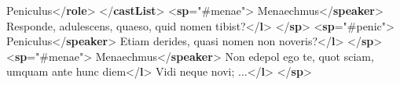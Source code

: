 \begin{shaded}
\hspace*{1em}Peniculus{</\textbf{role}>}\mbox{}\newline 
{}\mbox{}\newline 
{</\textbf{castList}>}\mbox{}\newline 
{<\textbf{sp}\hspace*{1em}{who}="{\#menae}">}\mbox{}\newline 
{}Menaechmus{</\textbf{speaker}>}\mbox{}\newline 
{}Responde, adulescens, quaeso, quid nomen tibist?{</\textbf{l}>}\mbox{}\newline 
{</\textbf{sp}>}\mbox{}\newline 
{<\textbf{sp}\hspace*{1em}{who}="{\#penic}">}\mbox{}\newline 
{}Peniculus{</\textbf{speaker}>}\mbox{}\newline 
{}Etiam derides, quasi nomen non noveris?{</\textbf{l}>}\mbox{}\newline 
{</\textbf{sp}>}\mbox{}\newline 
{<\textbf{sp}\hspace*{1em}{who}="{\#menae}">}\mbox{}\newline 
{}Menaechmus{</\textbf{speaker}>}\mbox{}\newline 
{}Non edepol ego te, quot sciam, umquam ante hunc diem{</\textbf{l}>}\mbox{}\newline 
{}Vidi neque novi; ...{</\textbf{l}>}\mbox{}\newline 
{</\textbf{sp}>}\end{shaded}\egroup\par \noindent  \par
